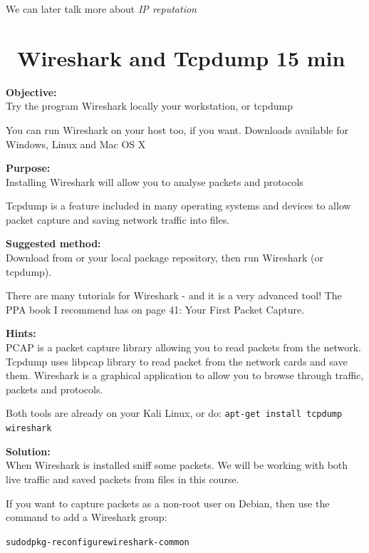\documentclass[a4paper,11pt,notitlepage]{report}
\begin{document}
We can later talk more about \emph{IP reputation}






\chapter{\faInfoCircle\ Wireshark and Tcpdump 15 min}
\label{ex:wireshark-install}



{\bf Objective:}\\
Try the program Wireshark locally your workstation, or tcpdump

You can run Wireshark on your host too, if you want. Downloads available for Windows, Linux and Mac OS X

{\bf Purpose:}\\
Installing Wireshark will allow you to analyse packets and protocols

Tcpdump is a feature included in many operating systems and devices to allow packet capture and saving network traffic into files.

{\bf Suggested method:}\\
Download from  or your local package repository, then
run Wireshark (or tcpdump).


There are many tutorials for Wireshark - and it is a very advanced tool! The PPA book I recommend has on page 41: Your First Packet Capture.

{\bf Hints:}\\
PCAP is a packet capture library allowing you to read packets from the network.
Tcpdump uses libpcap library to read packet from the network cards and save them.
Wireshark is a graphical application to allow you to browse through traffic, packets and protocols.

Both tools are already on your Kali Linux, or do: \verb+apt-get install tcpdump wireshark+

{\bf Solution:}\\
When Wireshark is installed sniff some packets. We will be working with both live traffic and saved packets from files in this course.

If you want to capture packets as a non-root user on Debian, then use the command to add a Wireshark group:
\begin{alltt}
sudo dpkg-reconfigure wireshark-common
\end{alltt}
\end{document}
